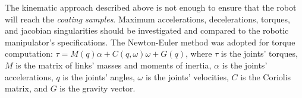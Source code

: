 \begin{figure}
	\centering
	\quad
\end{figure}

The kinematic approach described above is not enough to ensure that the robot
will reach the \textit{coating samples}. Maximum accelerations, decelerations,
torques, and jacobian singularities should be investigated and compared to the robotic
manipulator's specifications. The Newton-Euler method
\cite{sciavicco2000differential} was adopted for torque computation: $\tau =
M(q)\alpha + C(q,\omega)\omega + G(q)$, where $\tau$ is the joints' torques,
$M$ is the matrix of links' masses and moments of inertia, $\alpha$ is the
joints' accelerations, $q$ is the joints' angles, $\omega$ is the joints'
velocities, $C$ is the Coriolis matrix, and $G$ is the gravity vector.

